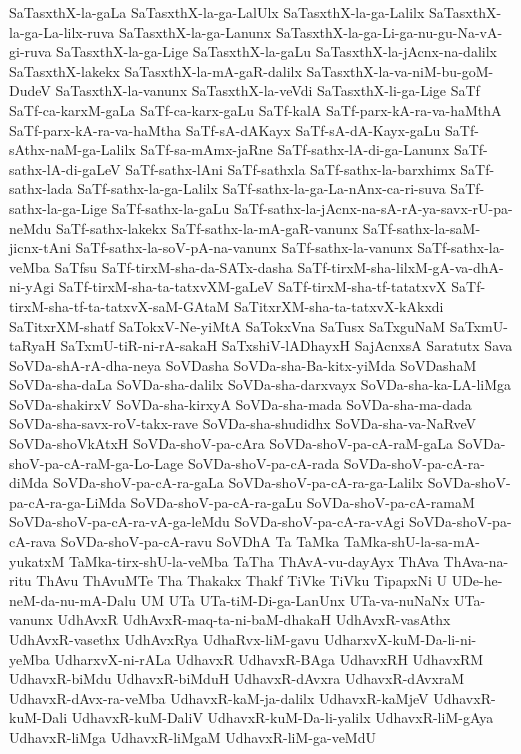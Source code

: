 {SaTasxthX-la-gaLa
SaTasxthX-la-ga-LalUlx
SaTasxthX-la-ga-Lalilx
SaTasxthX-la-ga-La-lilx-ruva
SaTasxthX-la-ga-Lanunx
SaTasxthX-la-ga-Li-ga-nu-gu-Na-vA-gi-ruva
SaTasxthX-la-ga-Lige
SaTasxthX-la-gaLu
SaTasxthX-la-jAcnx-na-dalilx
SaTasxthX-lakekx
SaTasxthX-la-mA-gaR-dalilx
SaTasxthX-la-va-niM-bu-goM-DudeV
SaTasxthX-la-vanunx
SaTasxthX-la-veVdi
SaTasxthX-li-ga-Lige
SaTf
SaTf-ca-karxM-gaLa
SaTf-ca-karx-gaLu
SaTf-kalA
SaTf-parx-kA-ra-va-haMthA
SaTf-parx-kA-ra-va-haMtha
SaTf-sA-dAKayx
SaTf-sA-dA-Kayx-gaLu
SaTf-sAthx-naM-ga-Lalilx
SaTf-sa-mAmx-jaRne
SaTf-sathx-lA-di-ga-Lanunx
SaTf-sathx-lA-di-gaLeV
SaTf-sathx-lAni
SaTf-sathxla
SaTf-sathx-la-barxhimx
SaTf-sathx-lada
SaTf-sathx-la-ga-Lalilx
SaTf-sathx-la-ga-La-nAnx-ca-ri-suva
SaTf-sathx-la-ga-Lige
SaTf-sathx-la-gaLu
SaTf-sathx-la-jAcnx-na-sA-rA-ya-savx-rU-pa-neMdu
SaTf-sathx-lakekx
SaTf-sathx-la-mA-gaR-vanunx
SaTf-sathx-la-saM-jicnx-tAni
SaTf-sathx-la-soV-pA-na-vanunx
SaTf-sathx-la-vanunx
SaTf-sathx-la-veMba
SaTfsu
SaTf-tirxM-sha-da-SATx-dasha
SaTf-tirxM-sha-lilxM-gA-va-dhA-ni-yAgi
SaTf-tirxM-sha-ta-tatxvXM-gaLeV
SaTf-tirxM-sha-tf-tatatxvX
SaTf-tirxM-sha-tf-ta-tatxvX-saM-GAtaM
SaTitxrXM-sha-ta-tatxvX-kAkxdi
SaTitxrXM-shatf
SaTokxV-Ne-yiMtA
SaTokxVna
SaTusx
SaTxguNaM
SaTxmU-taRyaH
SaTxmU-tiR-ni-rA-sakaH
SaTxshiV-lADhayxH
SajAcnxsA
Saratutx
Sava
SoVDa-shA-rA-dha-neya
SoVDasha
SoVDa-sha-Ba-kitx-yiMda
SoVDashaM
SoVDa-sha-daLa
SoVDa-sha-dalilx
SoVDa-sha-darxvayx
SoVDa-sha-ka-LA-liMga
SoVDa-shakirxV
SoVDa-sha-kirxyA
SoVDa-sha-mada
SoVDa-sha-ma-dada
SoVDa-sha-savx-roV-takx-rave
SoVDa-sha-shudidhx
SoVDa-sha-va-NaRveV
SoVDa-shoVkAtxH
SoVDa-shoV-pa-cAra
SoVDa-shoV-pa-cA-raM-gaLa
SoVDa-shoV-pa-cA-raM-ga-Lo-Lage
SoVDa-shoV-pa-cA-rada
SoVDa-shoV-pa-cA-ra-diMda
SoVDa-shoV-pa-cA-ra-gaLa
SoVDa-shoV-pa-cA-ra-ga-Lalilx
SoVDa-shoV-pa-cA-ra-ga-LiMda
SoVDa-shoV-pa-cA-ra-gaLu
SoVDa-shoV-pa-cA-ramaM
SoVDa-shoV-pa-cA-ra-vA-ga-leMdu
SoVDa-shoV-pa-cA-ra-vAgi
SoVDa-shoV-pa-cA-rava
SoVDa-shoV-pa-cA-ravu
SoVDhA
Ta
TaMka
TaMka-shU-la-sa-mA-yukatxM
TaMka-tirx-shU-la-veMba
TaTha
ThAvA-vu-dayAyx
ThAva
ThAva-na-ritu
ThAvu
ThAvuMTe
Tha
Thakakx
Thakf
TiVke
TiVku
TipapxNi
U
UDe-he-neM-da-nu-mA-Dalu
UM
UTa
UTa-tiM-Di-ga-LanUnx
UTa-va-nuNaNx
UTa-vanunx
UdhAvxR
UdhAvxR-maq-ta-ni-baM-dhakaH
UdhAvxR-vasAthx
UdhAvxR-vasethx
UdhAvxRya
UdhaRvx-liM-gavu
UdharxvX-kuM-Da-li-ni-yeMba
UdharxvX-ni-rALa
UdhavxR
UdhavxR-BAga
UdhavxRH
UdhavxRM
UdhavxR-biMdu
UdhavxR-biMduH
UdhavxR-dAvxra
UdhavxR-dAvxraM
UdhavxR-dAvx-ra-veMba
UdhavxR-kaM-ja-dalilx
UdhavxR-kaMjeV
UdhavxR-kuM-Dali
UdhavxR-kuM-DaliV
UdhavxR-kuM-Da-li-yalilx
UdhavxR-liM-gAya
UdhavxR-liMga
UdhavxR-liMgaM
UdhavxR-liM-ga-veMdU
}
